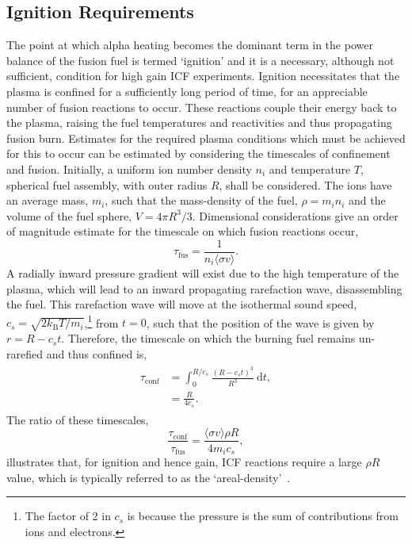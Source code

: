 \subsection{Ignition Requirements}%
\label{sec:intro_icf_ignition}

The point at which alpha heating becomes the dominant term in the power balance of the fusion fuel is termed `ignition' and it is a necessary, although not sufficient, condition for high gain \ac{ICF} experiments.
Ignition necessitates that the plasma is confined for a sufficiently long period of time, for an appreciable number of fusion reactions to occur.
These reactions couple their energy back to the plasma, raising the fuel temperatures and reactivities and thus propagating fusion burn.
Estimates for the required plasma conditions which must be achieved for this to occur can be estimated by considering the timescales of confinement and fusion.
Initially, a uniform ion number density $n_i$ and temperature $T$, spherical fuel assembly, with outer radius $R$, shall be considered.
The ions have an average mass, $m_i$, such that the mass-density of the fuel, $\rho = m_i n_i$ and the volume of the fuel sphere, $V = 4\pi R^3/3$.
Dimensional considerations give an order of magnitude estimate for the timescale on which fusion reactions occur,
\begin{equation}
    \tau_{\text{fus}} = \frac{1}{n_i \langle \sigma v \rangle}.
\end{equation}
A radially inward pressure gradient will exist due to the high temperature of the plasma, which will lead to an inward propagating rarefaction wave, disassembling the fuel.
This rarefaction wave will move at the isothermal sound speed, $c_s=\sqrt{2k_{\text{B}}T/m_i}$,\footnote{The factor of 2 in $c_s$ is because the pressure is the sum of contributions from ions and electrons.} from $t=0$, such that the position of the wave is given by $r=R-c_s t$.
Therefore, the timescale on which the burning fuel remains un-rarefied and thus confined is,
\begin{align}
    \begin{split}
        \tau_{\text{conf}} &= \int_0^{R/c_s} \frac{ {(R - c_s t)}^3 }{R^3} \ \text{d}t,\\
        &= \frac{R}{4 c_s}.
    \end{split}
\end{align}
The ratio of these timescales,
\begin{equation}
    \frac{\tau_{\text{conf}}}{\tau_{\text{fus}}} = \frac{\langle \sigma v \rangle \rho R}{4 m_i c_s},
\end{equation}
illustrates that, for ignition and hence gain, \ac{ICF} reactions require a large $\rho R$ value, which is typically referred to as the `areal-density'~\cite{fraley_thermonuclear_1974}.

